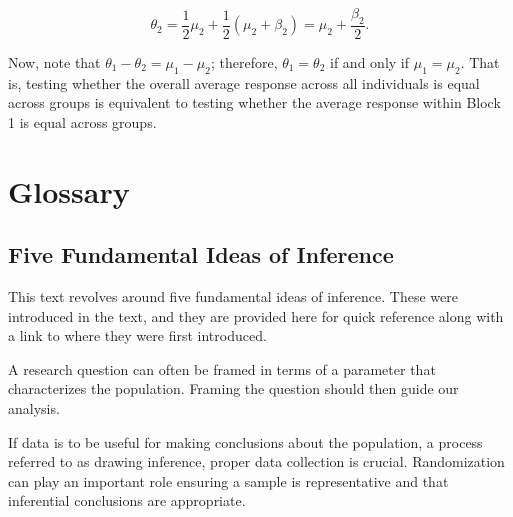 \documentclass[
  letterpaper,
  DIV=11,
  numbers=noendperiod]{scrreprt}
\theoremstyle{definition}
\theoremstyle{definition}
\theoremstyle{plain}
\theoremstyle{remark}
\begin{document}
\[\theta_2 = \frac{1}{2} \mu_2 + \frac{1}{2} \left(\mu_2 + \beta_2\right) = \mu_2 + \frac{\beta_2}{2}.\]

Now, note that \(\theta_1 - \theta_2 = \mu_1 - \mu_2\); therefore,
\(\theta_1 = \theta_2\) if and only if \(\mu_1 = \mu_2\). That is,
testing whether the overall average response across all individuals is
equal across groups is equivalent to testing whether the average
response within Block 1 is equal across groups.

\hypertarget{glossary}{%
\chapter{Glossary}\label{glossary}}

\hypertarget{five-fundamental-ideas-of-inference}{%
\section{Five Fundamental Ideas of
Inference}\label{five-fundamental-ideas-of-inference}}

This text revolves around five fundamental ideas of inference. These
were introduced in the text, and they are provided here for quick
reference along with a link to where they were first introduced.

\begin{tcolorbox}[enhanced jigsaw, rightrule=.15mm, colback=white, colbacktitle=quarto-callout-important-color!10!white, title=\textcolor{quarto-callout-important-color}{\faExclamation}\hspace{0.5em}{Fundamental Idea I (Chapter~\ref{sec-questions})}, arc=.35mm, toptitle=1mm, toprule=.15mm, breakable, titlerule=0mm, opacityback=0, colframe=quarto-callout-important-color-frame, opacitybacktitle=0.6, bottomrule=.15mm, bottomtitle=1mm, coltitle=black, left=2mm, leftrule=.75mm]

A research question can often be framed in terms of a parameter that
characterizes the population. Framing the question should then guide our
analysis.

\end{tcolorbox}

\begin{tcolorbox}[enhanced jigsaw, rightrule=.15mm, colback=white, colbacktitle=quarto-callout-important-color!10!white, title=\textcolor{quarto-callout-important-color}{\faExclamation}\hspace{0.5em}{Fundamental Idea II (Chapter~\ref{sec-data})}, arc=.35mm, toptitle=1mm, toprule=.15mm, breakable, titlerule=0mm, opacityback=0, colframe=quarto-callout-important-color-frame, opacitybacktitle=0.6, bottomrule=.15mm, bottomtitle=1mm, coltitle=black, left=2mm, leftrule=.75mm]

If data is to be useful for making conclusions about the population, a
process referred to as drawing inference, proper data collection is
crucial. Randomization can play an important role ensuring a sample is
representative and that inferential conclusions are appropriate.

\end{tcolorbox}
\end{document}
